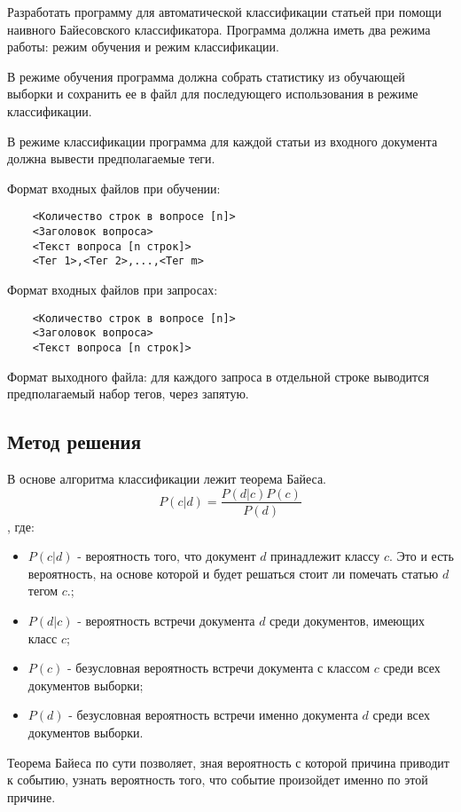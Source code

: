 \documentclass[12pt,a4paper]{scrartcl}
\begin{document}
Разработать программу для автоматической классификации статьей при помощи наивного Байесовского классификатора. Программа должна иметь два режима работы: режим обучения и режим классификации.

В режиме обучения программа должна собрать статистику из обучающей выборки и сохранить ее в файл для последующего использования в режиме классификации. 

В режиме классификации программа для каждой статьи из входного документа должна вывести предполагаемые теги. 

Формат входных файлов при обучении:
\begin{verbatim}
    <Количество строк в вопросе [n]>
    <Заголовок вопроса>
    <Текст вопроса [n строк]>
    <Тег 1>,<Тег 2>,...,<Тег m>
\end{verbatim}
    Формат входных файлов при запросах:
\begin{verbatim}
    <Количество строк в вопросе [n]>
    <Заголовок вопроса>
    <Текст вопроса [n строк]>
\end{verbatim}

Формат выходного файла: для каждого запроса в отдельной строке выводится предполагаемый набор тегов, через запятую.

\subsection*{Метод решения}

В основе алгоритма классификации лежит теорема Байеса.
\begin{equation*}
P(c|d) = \frac{ P(d|c)P(c) }{ P(d) }
\end{equation*}
, где:
\begin{itemize}
    \item $P(c|d)$ - вероятность того, что документ $d$ принадлежит классу $c$.
    Это и есть вероятность, на основе которой и будет решаться стоит ли помечать статью $d$ тегом $c$.;
    \item $P(d|c)$ - вероятность встречи документа $d$ среди документов, имеющих класс $c$;
    \item $P(c)$ - безусловная вероятность встречи документа с классом $c$ среди всех документов выборки;
    \item $P(d)$ - безусловная вероятность встречи именно документа $d$ среди всех документов выборки. 
\end{itemize}

Теорема Байеса по сути позволяет, зная вероятность с которой причина приводит к событию, узнать вероятность того, что событие произойдет именно по этой причине.
\end{document}
